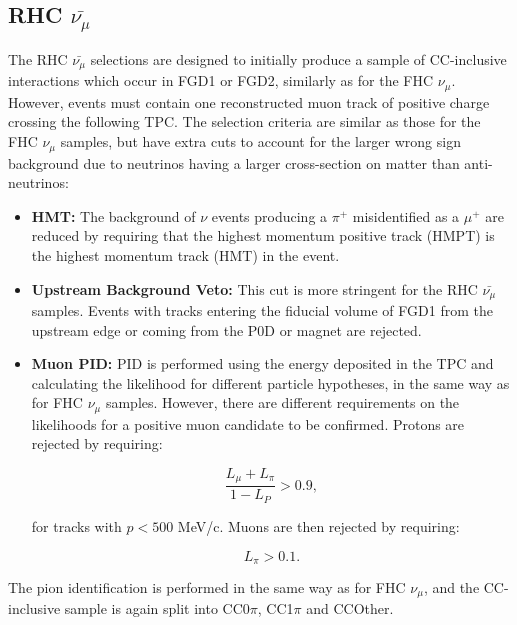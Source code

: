 \subsection{RHC $\bar{\nu_{\mu}}$}

The RHC $\bar{\nu_{\mu}}$ selections are designed to initially produce a sample of CC-inclusive interactions which occur in FGD1 or FGD2, similarly as for the FHC $\nu_{\mu}$. However, events must contain one reconstructed muon track of positive charge crossing the following TPC. The selection criteria are similar as those for the FHC $\nu_{\mu}$ samples, but have extra cuts to account for the larger wrong sign background due to neutrinos having a larger cross-section on matter than anti-neutrinos:

\begin{itemize}

\item \textbf{HMT:} The background of $\nu$ events producing a $\pi^+$ misidentified as a $\mu^+$ are reduced by requiring that the highest momentum positive track (HMPT) is the highest momentum track (HMT) in the event.

\item \textbf{Upstream Background Veto:} This cut is more stringent for the RHC $\bar{\nu_{\mu}}$ samples. Events with tracks entering the fiducial volume of FGD1 from the upstream edge or coming from the P0D or magnet are rejected.

\item \textbf{Muon PID:} PID is performed using the energy deposited in the TPC and calculating the likelihood for different particle hypotheses, in the same way as for FHC $\nu_{\mu}$ samples. However, there are different requirements on the likelihoods for a positive muon candidate to be confirmed. Protons are rejected by requiring:

\begin{equation}
\frac{L_{\mu}+L_{\pi}}{1-L_P} > 0.9,
\end{equation}

for tracks with  $p < 500$ MeV/c. Muons are then rejected by requiring:

\begin{equation}
L_{\pi} > 0.1.
\end{equation}

\end{itemize}

The pion identification is performed in the same way as for FHC $\nu_{\mu}$, and the CC-inclusive sample is again split into CC0$\pi$, CC1$\pi$ and CCOther.

